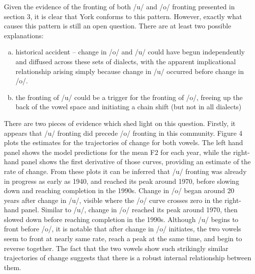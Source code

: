 \documentclass[12pt]{article}
\begin{document}
Given the evidence of the fronting of both /u/ and /o/ fronting presented in section 3, it is clear that York conforms to this pattern. However, exactly what causes this pattern is still an open question. There are at least two possible explanations:
\begin{enumerate}[(a)]
\item{historical accident -- change in /o/ and /u/ could have begun independently and diffused across these sets of dialects, with the apparent implicational relationship arising simply because change in /u/ occurred before change in /o/.}
\item{the fronting of /u/ could be a trigger for the fronting of /o/, freeing up the back of the vowel space and initiating a chain shift (but not in all dialects)}
\end{enumerate}
There are two pieces of evidence which shed light on this question. Firstly, it appears that /u/ fronting did precede /o/ fronting in this community. Figure 4 plots the estimates for the trajectories of change for both vowels. The left hand panel shows the model predictions for the mean F2 for each year, while the right-hand panel shows the first derivative of those curves, providing an estimate of the rate of change. From these plots it can be inferred that /u/ fronting was already in progress as early as 1940, and reached its peak around 1970, before slowing down and reaching completion in the 1990s. Change in /o/ began around 20 years after change in /u/, visible where the /o/ curve crosses zero in the right-hand panel. Similar to /u/, change in /o/ reached its peak around 1970, then slowed down before reaching completion in the 1990s. Although /u/ begins to front before /o/, it is notable that after change in /o/ initiates, the two vowels seem to front at nearly same rate, reach a peak at the same time, and begin to reverse together. The fact that the two vowels show such strikingly similar trajectories of change suggests that there is a robust internal relationship between them.
\end{document}
